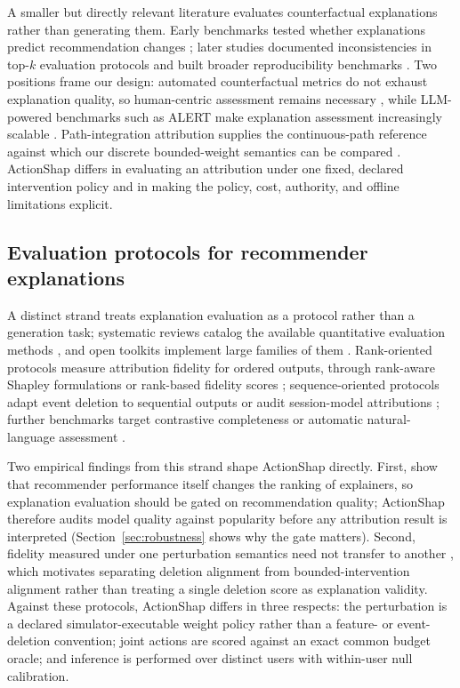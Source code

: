 \documentclass[manuscript,screen,review,anonymous]{acmart}
\begin{document}
A smaller but directly relevant literature evaluates counterfactual explanations rather than generating them. Early benchmarks tested whether explanations predict recommendation changes \citep{yao2022,baklanov2024}; later studies documented inconsistencies in top-$k$ evaluation protocols \citep{mohammadi2025} and built broader reproducibility benchmarks \citep{nguyen2026}. Two positions frame our design: automated counterfactual metrics do not exhaust explanation quality, so human-centric assessment remains necessary \citep{domnich2025unifying}, while LLM-powered benchmarks such as ALERT make explanation assessment increasingly scalable \citep{li2025alert}. Path-integration attribution supplies the continuous-path reference against which our discrete bounded-weight semantics can be compared \citep{sundararajan2017axiomatic}. ActionShap differs in evaluating an attribution under one fixed, declared intervention policy and in making the policy, cost, authority, and offline limitations explicit.

\subsection{Evaluation protocols for recommender explanations}
A distinct strand treats explanation evaluation as a protocol rather than a generation task; systematic reviews catalog the available quantitative evaluation methods \citep{nauta2023survey}, and open toolkits implement large families of them \citep{hedstrom2023quantus}. Rank-oriented protocols measure attribution fidelity for ordered outputs, through rank-aware Shapley formulations \citep{chowdhury2024rankshap} or rank-based fidelity scores \citep{pliatsika2025sharpl}; sequence-oriented protocols adapt event deletion to sequential outputs \citep{bento2021timeshap} or audit session-model attributions \citep{bruun2025session}; further benchmarks target contrastive completeness \citep{mousavi2023clime} or automatic natural-language assessment \citep{li2025alert}.

Two empirical findings from this strand shape ActionShap directly. First, \citet{mohammadi2024recsys} show that recommender performance itself changes the ranking of explainers, so explanation evaluation should be gated on recommendation quality; ActionShap therefore audits model quality against popularity before any attribution result is interpreted (Section~\ref{sec:robustness} shows why the gate matters). Second, fidelity measured under one perturbation semantics need not transfer to another \citep{baklanov2025fidelity,barkan2026spinrec}, which motivates separating deletion alignment from bounded-intervention alignment rather than treating a single deletion score as explanation validity. Against these protocols, ActionShap differs in three respects: the perturbation is a declared simulator-executable weight policy rather than a feature- or event-deletion convention; joint actions are scored against an exact common budget oracle; and inference is performed over distinct users with within-user null calibration.
\end{document}
